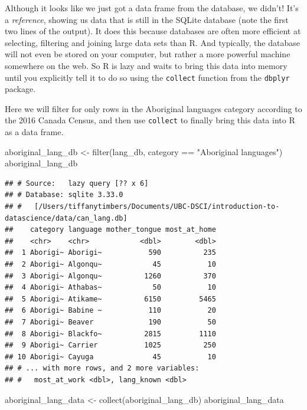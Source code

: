 \documentclass[
]{krantz}
\makeatletter
\newenvironment{Shaded}{\begin{snugshade}}{\end{snugshade}}
\newcommand{\FunctionTok}[1]{\textcolor[rgb]{0,0,0}{#1}}
\newcommand{\NormalTok}[1]{#1}
\newcommand{\OtherTok}[1]{\textcolor[rgb]{0.37,0.37,0.37}{#1}}
\newcommand{\SpecialCharTok}[1]{\textcolor[rgb]{0,0,0}{#1}}
\newcommand{\StringTok}[1]{\textcolor[rgb]{0.5,0.5,0.5}{#1}}
\newenvironment{kframe}{%
\medskip{}
\setlength{\fboxsep}{.8em}
 \def\at@end@of@kframe{}%
 \ifinner\ifhmode%
  \def\at@end@of@kframe{\end{minipage}}%
  \begin{minipage}{\columnwidth}%
 \fi\fi%
 \def\FrameCommand##1{\hskip\@totalleftmargin \hskip-\fboxsep
 \colorbox{shadecolor}{##1}\hskip-\fboxsep
     \hskip-\linewidth \hskip-\@totalleftmargin \hskip\columnwidth}%
 \MakeFramed {\advance\hsize-\width
   \@totalleftmargin\z@ \linewidth\hsize
   \@setminipage}}%
 {\par\unskip\endMakeFramed%
 \at@end@of@kframe}
\renewenvironment{Shaded}{\begin{kframe}}{\end{kframe}}
\makeatother
\begin{document}
Although it looks like we just got a data frame from the database, we didn't! It's a \emph{reference}, showing us data that is still in the SQLite database (note the first two lines of the output).
It does this because databases are often more efficient at selecting, filtering and joining large data sets than R. And typically, the database will not even be
stored on your computer, but rather a more powerful machine somewhere on the web. So R is lazy and waits to bring this data into memory until you explicitly tell
it to do so using the \texttt{collect} function from the \texttt{dbplyr} package.

Here we will filter for only rows in the Aboriginal languages category according to the 2016 Canada Census, and then use \texttt{collect} to finally bring this data into R as a data frame.

\begin{Shaded}
\begin{Highlighting}[]
\NormalTok{aboriginal\_lang\_db }\OtherTok{\textless{}{-}} \FunctionTok{filter}\NormalTok{(lang\_db, category }\SpecialCharTok{==} \StringTok{"Aboriginal languages"}\NormalTok{)}
\NormalTok{aboriginal\_lang\_db}
\end{Highlighting}
\end{Shaded}

\begin{verbatim}
## # Source:   lazy query [?? x 6]
## # Database: sqlite 3.33.0
## #   [/Users/tiffanytimbers/Documents/UBC-DSCI/introduction-to-datascience/data/can_lang.db]
##    category language mother_tongue most_at_home
##    <chr>    <chr>            <dbl>        <dbl>
##  1 Aborigi~ Aborigi~           590          235
##  2 Aborigi~ Algonqu~            45           10
##  3 Aborigi~ Algonqu~          1260          370
##  4 Aborigi~ Athabas~            50           10
##  5 Aborigi~ Atikame~          6150         5465
##  6 Aborigi~ Babine ~           110           20
##  7 Aborigi~ Beaver             190           50
##  8 Aborigi~ Blackfo~          2815         1110
##  9 Aborigi~ Carrier           1025          250
## 10 Aborigi~ Cayuga              45           10
## # ... with more rows, and 2 more variables:
## #   most_at_work <dbl>, lang_known <dbl>
\end{verbatim}

\begin{Shaded}
\begin{Highlighting}[]
\NormalTok{aboriginal\_lang\_data }\OtherTok{\textless{}{-}} \FunctionTok{collect}\NormalTok{(aboriginal\_lang\_db)}
\NormalTok{aboriginal\_lang\_data}
\end{Highlighting}
\end{Shaded}
\end{document}
